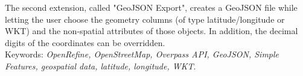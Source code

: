 \newline
The second extension, called "GeoJSON Export", creates a GeoJSON file while letting the user choose the geometry columns (of type latitude/longitude or WKT) and the non-spatial attributes of those objects. In addition, the decimal digits of the coordinates can be overridden.
\\
\newline
Keywords: \textit{OpenRefine, OpenStreetMap, Overpass API, GeoJSON, Simple Features, geospatial data, latitude, longitude, WKT}.